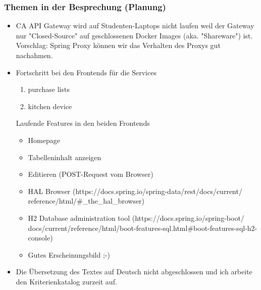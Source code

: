 \documentclass{article}
\begin{document}
\subsubsection{Themen in der Besprechung (Planung)}
\begin{itemize}
    \item CA API Gateway wird auf Studenten-Laptops nicht laufen weil der Gateway nur "Closed-Source" auf geschlossenen Docker Images (aka. "Shareware") ist. Vorschlag: Spring Proxy können wir das Verhalten des Proxys gut nachahmen.
    \item Fortschritt bei den Frontends für die Services
        \begin{enumerate}
            \item purchase lists \checkmark
            \item kitchen device \checkmark
        \end{enumerate}
        Laufende Features in den beiden Frontends
        \begin{itemize}
            \item Homepage
            \item Tabelleninhalt anzeigen
            \item Editieren (POST-Request vom Browser)
            \item HAL Browser (https://docs.spring.io/spring-data/rest/docs/current/\\reference/html/\#\_the\_hal\_browser)
            \item H2 Database administration tool (https://docs.spring.io/spring-boot/\\docs/current/reference/html/boot-features-sql.html\#boot-features-sql-h2-console)
            \item Gutes Erscheinungsbild ;-)
        \end{itemize}
    \item Die Übersetzung des Textes auf Deutsch nicht abgeschlossen und ich arbeite den Kriterienkatalog zurzeit auf.
\end{itemize}
\end{document}
